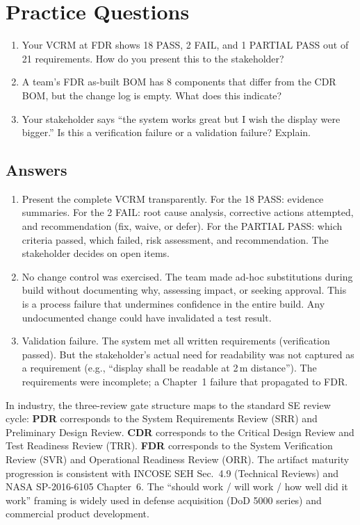\documentclass[11pt,letterpaper,twoside,openany]{book}
\begin{document}
\section{Practice Questions}
\begin{enumerate}[leftmargin=1.5em]
\item Your VCRM at FDR shows 18 PASS, 2 FAIL, and 1 PARTIAL PASS out of 21 requirements. How do you present this to the stakeholder?
\item A team's FDR as-built BOM has 8 components that differ from the CDR BOM, but the change log is empty. What does this indicate?
\item Your stakeholder says ``the system works great but I wish the display were bigger.'' Is this a verification failure or a validation failure? Explain.
\end{enumerate}

\subsection{Answers}
\begin{enumerate}[leftmargin=1.5em]
\item Present the complete VCRM transparently. For the 18 PASS: evidence summaries. For the 2 FAIL: root cause analysis, corrective actions attempted, and recommendation (fix, waive, or defer). For the PARTIAL PASS: which criteria passed, which failed, risk assessment, and recommendation. The stakeholder decides on open items.
\item No change control was exercised. The team made ad-hoc substitutions during build without documenting why, assessing impact, or seeking approval. This is a process failure that undermines confidence in the entire build. Any undocumented change could have invalidated a test result.
\item Validation failure. The system met all written requirements (verification passed). But the stakeholder's actual need for readability was not captured as a requirement (e.g., ``display shall be readable at 2\,m distance''). The requirements were incomplete; a Chapter~1 failure that propagated to FDR.
\end{enumerate}


\backmatter


\begin{keyconceptbox}
In industry, the three-review gate structure maps to the standard SE review cycle: \textbf{PDR} corresponds to the System Requirements Review (SRR) and Preliminary Design Review. \textbf{CDR} corresponds to the Critical Design Review and Test Readiness Review (TRR). \textbf{FDR} corresponds to the System Verification Review (SVR) and Operational Readiness Review (ORR). The artifact maturity progression is consistent with INCOSE SEH Sec.~4.9 (Technical Reviews) and NASA SP-2016-6105 Chapter~6. The ``should work / will work / how well did it work'' framing is widely used in defense acquisition (DoD 5000 series) and commercial product development.
\end{keyconceptbox}
\end{document}
